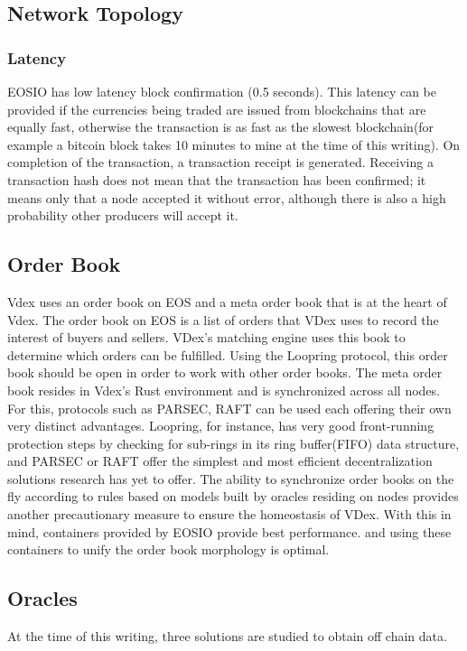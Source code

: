 \documentclass[]{article}
\begin{document}
{\subsection{Network Topology}


\subsubsection{Latency}    
EOSIO has low latency block confirmation (0.5 seconds).\cite{3}
This latency can be provided if the currencies being traded are issued from blockchains that are equally fast, otherwise the transaction is as fast as the slowest blockchain(for example a bitcoin block takes 10 minutes to mine at the time of this writing). 
On completion of the transaction, a transaction receipt is generated. 
Receiving a transaction hash does not mean that the transaction has been confirmed; it means only that a node accepted it without error, although there is also a high probability other producers will accept it. 

\subsection{Order Book}
Vdex uses an order book on EOS and a meta order book that is at the heart of Vdex. 
The order book on EOS is a list of orders that VDex uses to record the interest of buyers and sellers. 
VDex's matching engine uses this book to determine which orders can be fulfilled.
Using the Loopring protocol, this order book should be open in order to work with other order books.\cite{7}
The meta order book resides in Vdex's Rust environment and is synchronized across all nodes.
For this, protocols such as PARSEC, RAFT can be used each offering their own very distinct advantages. Loopring, for instance, has very good front-running protection steps by checking for sub-rings in its ring buffer(FIFO) data structure, and PARSEC or RAFT offer the simplest and most efficient decentralization solutions research has yet to offer.
The ability to synchronize order books on the fly according to rules based on models built by oracles residing on nodes provides another precautionary measure to ensure the homeostasis of VDex.
With this in mind, containers provided by EOSIO provide best performance.\cite{25} and
using these containers to unify the order book morphology is optimal.

\subsection{Oracles}
At the time of this writing, three solutions are studied to obtain off chain data.
}
\end{document}

